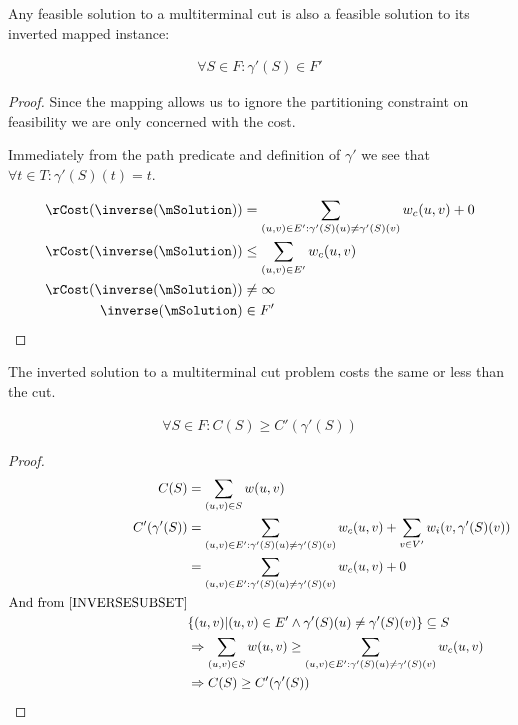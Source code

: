 \begin{lemma}
\label{INVERSEFEASIBLE}
Any feasible solution to a multiterminal cut is also a feasible solution to its inverted mapped instance:

\begin{align}
	\nonumber \forall S \in F : \gamma'(S) \in F'
\end{align}
\end{lemma}
\begin{proof}
Since the mapping allows us to ignore the partitioning constraint on feasibility we are only concerned with the cost.

Immediately from the path predicate and definition of $\gamma'$ we see that $\forall t \in T : \gamma'(S)(t) = t$.

\begin{align}
	\nonumber \rCost(\inverse(\mSolution)) & = \displaystyle\sum\limits_{(u,v) \in E' : \gamma'(S)(u) \neq \gamma'(S)(v)} w_c(u,v) + 0 \\
	\nonumber \rCost(\inverse(\mSolution)) & \leq \displaystyle\sum\limits_{(u,v) \in E'} w_c(u,v) \\
	\nonumber \rCost(\inverse(\mSolution)) & \neq \infty \\
	\nonumber \inverse(\mSolution) & \in F'
\end{align}
\end{proof}

\begin{lemma}
\label{INVERSECOST}
The inverted solution to a multiterminal cut problem costs the same or less than the cut.

\begin{align}
	\nonumber \forall S \in F : C(S) \geq C'(\gamma'(S))
\end{align}
\end{lemma}
\begin{proof}
\begin{align}
	\nonumber C(S) & = \displaystyle\sum\limits_{(u,v) \in S} w(u,v)\\
	\nonumber C'(\gamma'(S)) & = \displaystyle\sum\limits_{(u,v) \in E' : \gamma'(S)(u) \neq \gamma'(S)(v)} w_c(u,v) + \displaystyle\sum\limits_{v \in V'} w_i(v, \gamma'(S)(v)) \\
	\nonumber & = \displaystyle\sum\limits_{(u,v) \in E' : \gamma'(S)(u) \neq \gamma'(S)(v)} w_c(u,v) + 0 \\
	\nonumber \mbox{And from \ref{INVERSESUBSET}} \\
	\nonumber & \{(u,v) | (u,v) \in E' \wedge \gamma'(S)(u) \neq \gamma'(S)(v)\} \subseteq S \\
	\nonumber & \Rightarrow \displaystyle\sum\limits_{(u,v) \in S} w(u,v) \geq \displaystyle\sum\limits_{(u,v) \in E' : \gamma'(S)(u) \neq \gamma'(S)(v)} w_c(u,v) \\
	\nonumber & \Rightarrow C(S) \geq C'(\gamma'(S))
\end{align}
\end{proof}

